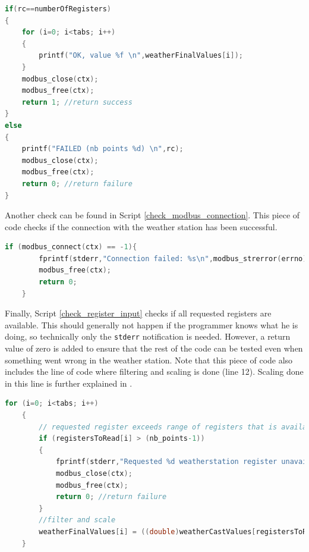 \scriptsize
\begin{lstlisting}[language=C,caption={Comparing rc to numberOfRegisters},label={rc_check}]
if(rc==numberOfRegisters)
{
    for (i=0; i<tabs; i++)
    {
        printf("OK, value %f \n",weatherFinalValues[i]);
    }
    modbus_close(ctx);
    modbus_free(ctx);
    return 1; //return success
}
else
{
    printf("FAILED (nb points %d) \n",rc);
    modbus_close(ctx);
    modbus_free(ctx);
    return 0; //return failure
}
\end{lstlisting}
\normalsize

Another check can be found in Script \ref{check_modbus_connection}. This piece of code checks if the connection with the weather station has been successful.\\

\scriptsize
\begin{lstlisting}[language=C,caption={Checking if a connection can be established with the weather station},label={check_modbus_connection}]
	if (modbus_connect(ctx) == -1){
		fprintf(stderr,"Connection failed: %s\n",modbus_strerror(errno));
		modbus_free(ctx);
		return 0;
	}
\end{lstlisting}
\normalsize

Finally, Script \ref{check_register_input} checks if all requested registers are available. This should generally not happen if the programmer knows what he is doing, so technically only the \verb|stderr| notification is needed. However, a return value of zero is added to ensure that the rest of the code can be tested even when something went wrong in the weather station. Note that this piece of code also includes the line of code where filtering and scaling is done (line 12). Scaling done in this line is further explained in .

\scriptsize
\begin{lstlisting}[language=C,caption={Checking if the requested registers are available},label={check_register_input}]
    for (i=0; i<tabs; i++)
    {
        // requested register exceeds range of registers that is available
        if (registersToRead[i] > (nb_points-1))
        {
            fprintf(stderr,"Requested %d weatherstation register unavailable\n", registersToRead[i]);
            modbus_close(ctx);
            modbus_free(ctx);
            return 0; //return failure
        }
        //filter and scale
        weatherFinalValues[i] = ((double)weatherCastValues[registersToRead[i]])/weatherScale[registersToRead[i]];
    }
\end{lstlisting}
\normalsize
